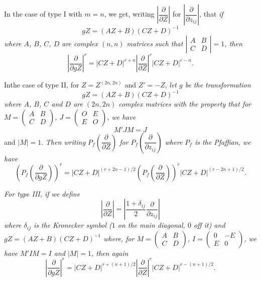 In the case of type I with $m=n$, we get, writing $\left|\dfrac{\partial}{\partial Z}\right|$ for $\left|\dfrac{\partial}{\partial z_{ij}}\right|$, that {\em if}
$$
gZ=(AZ+B)(CZ+D)^{-1}
$$
{\em where $A$, $B$, $C$, $D$ are complex $(n,n)$ matrices such that $\left|\begin{smallmatrix} A & B\\ C & D\end{smallmatrix}\right|=1$, then}
\begin{equation}
\left|\frac{\partial}{\partial gZ}\right|^{r}=|CZ+D|^{r+n}\left|\frac{\partial}{\partial Z}\right|^{r}|CZ+D|^{r-n}.\label{art13-eq3.12}
\end{equation}

In\pageoriginale the case of type II, for $Z=Z^{(2n,2n)}$ and $Z'=-Z$, {\em let $g$ be the transformation}
$$
gZ=(AZ+B)(CZ+D)^{-1}
$$
{\em where $A$, $B$, $C$ and $D$ are $(2n,2n)$ complex matrices with the property that for $M=\left(\begin{smallmatrix} A & B\\ C & D\end{smallmatrix}\right)$, $J=\left(\begin{smallmatrix} O & E\\ E & O\end{smallmatrix}\right)$, we have}
$$
M'JM=J
$$
and $|M|=1$. {\em Then writing $P_{f}\left(\dfrac{\partial}{\partial Z}\right)$ for $P_{f}\left(\dfrac{\partial}{\partial z_{ij}}\right)$ where $P_{f}$ is the Pfaffian, we have}
\begin{equation}
\left(P_{f}\left(\frac{\partial}{\partial gZ}\right)\right)^{r}=|CZ+D|^{(r+2n-1)/2}\left(P_{f}\left(\frac{\partial}{\partial Z}\right)\right)^{r}|CZ+D|^{(r-2n+1)/2}.\label{art13-eq3.13}
\end{equation}

{\em For type III, if we define}
$$
\left|\dfrac{\partial}{\partial Z}\right|=\left|\frac{1+\delta_{ij}}{2}\frac{\partial}{\partial z_{ij}}\right|
$$
{\em where $\delta_{ij}$ is the Kronecker symbol ($1$ on the main diagonal, $0$ off it) and $gZ=(AZ+B)(CZ+D)^{-1}$ where, for $M=\left(\begin{smallmatrix} A & B\\ C & D\end{smallmatrix}\right)$, $I=\left(\begin{smallmatrix} 0 & -E\\ E & 0\end{smallmatrix}\right)$, we have $M'IM=I$ and $|M|=1$, then again}
\begin{equation}
\left|\frac{\partial}{\partial gZ}\right|^{r}=|CZ+D|^{r+(n+1)/2}\left|\frac{\partial}{\partial Z}\right|^{r}|CZ+D|^{r-(n+1)/2}.\label{art13-eq3.14}
\end{equation}

